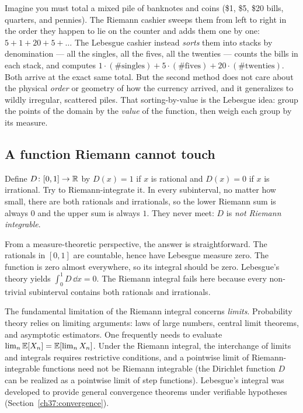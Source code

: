 Imagine you must total a mixed pile of banknotes and coins (\$1, \$5, \$20 bills,
quarters, and pennies). The Riemann cashier sweeps them from left to right in the
order they happen to lie on the counter and adds them one by one:
$5 + 1 + 20 + 5 + \dots$ The Lebesgue cashier instead \emph{sorts} them
into stacks by denomination --- all the singles, all the fives, all the
twenties --- counts the bills in each stack, and computes
$1\cdot(\text{\# singles}) + 5\cdot(\text{\# fives}) + 20\cdot(\text{\# twenties})$.
Both arrive at the exact same total. But the second method does not care about
the physical \emph{order} or geometry of how the currency arrived, and it
generalizes to wildly irregular, scattered piles. That
sorting-by-value is the Lebesgue idea: group the points of the domain by the
\emph{value} of the function, then weigh each group by its measure.

\subsection{A function Riemann cannot touch}

\begin{example}
\label{ch37:dirichlet}
Define $D\colon[0,1]\to\mathbb{R}$ by $D(x)=1$ if $x$ is rational and $D(x)=0$ if $x$ is
irrational. Try to Riemann-integrate it. In every subinterval, no matter how
small, there are both rationals and irrationals, so the lower Riemann sum is
always $0$ and the upper sum is always $1$. They never meet: $D$ is
\emph{not Riemann integrable}.

From a measure-theoretic perspective, the answer is straightforward. The
rationals in $[0,1]$ are countable, hence have Lebesgue measure zero.
The function is zero almost everywhere, so its integral should be zero.
Lebesgue's theory yields $\int_0^1 D\,\dd x = 0$. The Riemann integral
fails here because every non-trivial subinterval contains both rationals and irrationals.
\end{example}

\begin{whybox}
The fundamental limitation of the Riemann integral concerns \emph{limits}.
Probability theory relies on limiting arguments: laws of large numbers,
central limit theorems, and asymptotic estimators. One frequently needs to evaluate
$\lim_n \operatorname{\mathbb{E}}[X_n] = \operatorname{\mathbb{E}}[\lim_n X_n]$. Under the Riemann integral, the interchange of
limits and integrals requires restrictive conditions, and a pointwise limit of
Riemann-integrable functions need not be Riemann integrable (the Dirichlet function
$D$ can be realized as a pointwise limit of step functions). Lebesgue's integral
was developed to provide general convergence theorems under verifiable hypotheses (Section~\ref{ch37:convergence}).
\end{whybox}

